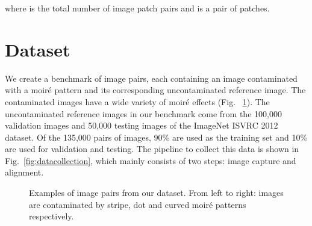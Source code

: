 \documentclass[journal]{IEEEtran}
\begin{document}
where  is the total number of image patch pairs and  is a pair of patches. 

\section{Dataset}

We create a benchmark of  image pairs, each containing an image contaminated with a moir\'{e} pattern and its corresponding uncontaminated reference image. The contaminated images have a wide variety of moir\'{e} effects (Fig. ~\ref{fig:moireDemo}).
The uncontaminated reference images in our benchmark come from the 100,000 validation images and 50,000 testing images of the ImageNet ISVRC 2012 dataset. Of the 135,000 pairs of images, 90\% are used as the training set and 10\% are used for validation and testing. The pipeline to collect this data is shown in Fig.~\ref{fig:datacollection}, which mainly consists of two steps: image capture and alignment.

\begin{figure}[b]
\begin{center}
\hspace{-.8em}
 \hspace{-.8em}
 \hspace{-.8em}
\end{center}
\addtocounter{subfigure}{-3}
\vspace{-1.5em}
\begin{center}
 \hspace{-.8em}
 \hspace{-.8em}
\end{center}
 \caption{Examples of image pairs from our dataset. From left to right: images are contaminated by stripe, dot and curved moir\'{e} patterns respectively.}
\label{fig:moireDemo}
\end{figure}
\end{document}
